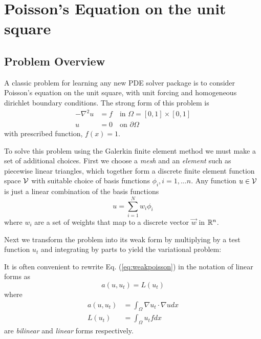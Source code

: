 \chapter{Poisson's Equation on the unit square}
\label{cha:poiss-equat-unit}

\section{Problem Overview}
\label{sec:problem-formulation}

A classic problem for learning any new PDE solver package is to
consider  Poisson's equation on the unit square,  with unit
forcing and homogeneous dirichlet boundary conditions.  The strong
form of this problem is
\begin{align}
-\nabla^2u &= f \quad\text{in } \Omega=[0,1]\times[0,1]\\
u &= 0 \quad\text{on } \partial\Omega
\end{align}
with  prescribed function, $f(x)=1$. 

To solve this problem using the Galerkin finite element method we must make a set of
additional choices. First we choose a \emph{mesh} and an \emph{element} such as
piecewise linear triangles, which together form a discrete finite
element function space $\mathcal{V}$ with suitable choice of basis
functions $\phi_{i}, i=1,\ldots n$. Any function $u\in\mathcal{V}$ is just a
linear combination of the basis functions
\begin{equation}
  \label{eq:6}
  u = \sum_{i=1}^{N} w_{i}\phi_{i}
\end{equation}
where $w_{i}$ are a set of weights that map to a discrete vector $\vec{w}$ in $\mathbb{R}^n{}$.

Next we transform the problem into its weak form by multiplying by a
test function $u_{t}$ and integrating by parts to yield the
variational problem: 
\begin{quote}
\end{quote}
It is often convenient to rewrite Eq. (\ref{eq:weakpoisson}) in the
notation of linear forms as
\begin{equation}
\label{eq:7}
  a(u,u_{t}) = L(u_{t})
\end{equation}
where
\begin{align}
  \label{eq:5}
  a(u,u_{t}) &= \int_\Omega \nabla u_t\cdot \nabla u dx\\
  L(u_{t})    &=  \int_\Omega u_t f dx
\end{align}
are \emph{bilinear} and \emph{linear} forms respectively.

